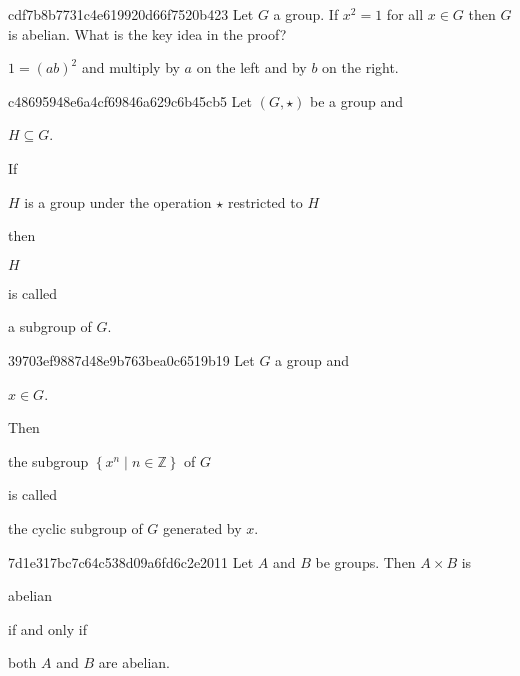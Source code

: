\begin{note}{cdf7b8b7731c4e619920d66f7520b423}
    Let \({ G }\) a group. If \({ x^2 = 1 }\) for all \({ x \in G }\) then \({ G }\) is abelian.
    What is the key idea in the proof?

    \begin{cloze}{1}
        \({ 1 = (ab)^2 }\) and multiply by \({ a }\) on the left and by \({ b }\) on the right.
    \end{cloze}
\end{note}

\begin{note}{c48695948e6a4cf69846a629c6b45cb5}
    Let \({ (G, \star) }\) be a group and \begin{icloze}{4}\({ H \subseteq G }\).\end{icloze}
    If \begin{icloze}{2}\({ H }\) is a group under the operation \({ \star }\) restricted to \({ H }\)\end{icloze} then \begin{icloze}{3}\({ H }\)\end{icloze} is called \begin{icloze}{1}a subgroup of \({ G }\).\end{icloze}
\end{note}

\begin{note}{39703ef9887d48e9b763bea0c6519b19}
    Let \({ G }\) a group and \begin{icloze}{3}\({ x \in G }\).\end{icloze} Then \begin{icloze}{2}the subgroup \({ \left\{ x^{n} \mid n \in \mathbb Z \right\} }\) of \({ G }\)\end{icloze} is called \begin{icloze}{1}the cyclic subgroup of \({ G }\) generated by \({ x }\).\end{icloze}
\end{note}

\begin{note}{7d1e317bc7c64c538d09a6fd6c2e2011}
    Let \({ A }\) and \({ B }\) be groups. Then \({ A \times B }\) is \begin{icloze}{3}abelian\end{icloze} \begin{icloze}{2}if and only if\end{icloze} \begin{icloze}{1}both \({ A }\) and \({ B }\) are abelian.\end{icloze}
\end{note}

